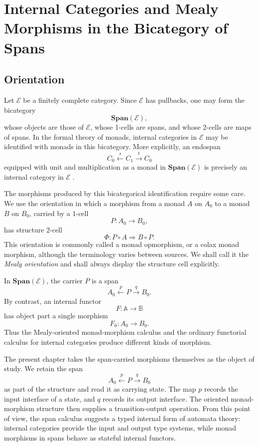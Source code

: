 \chapter{Internal Categories and Mealy Morphisms in the Bicategory of Spans}
\label{ch:spans-internal-categories-mealy}

\section{Orientation}
\label{sec:ch1-orientation}

Let \(\mathcal E\) be a finitely complete category. Since \(\mathcal E\) has pullbacks, one may form the bicategory
\[
    \mathbf{Span}(\mathcal E),
\]
whose objects are those of \(\mathcal E\), whose 1-cells are spans, and whose 2-cells are maps of spans. In the formal theory of monads, internal categories in \(\mathcal E\) may be identified with monads in this bicategory. More explicitly, an endospan
\[
    C_0 \xleftarrow{s} C_1 \xrightarrow{t} C_0
\]
equipped with unit and multiplication as a monad in \(\mathbf{Span}(\mathcal E)\) is precisely an internal category in \(\mathcal E\) \cite{BenabouBicategories,StreetFormalTheoryOfMonads,LackCompanion,MirandaInternalCategories}.

The morphisms produced by this bicategorical identification require some care. We use the orientation in which a morphism from a monad \(A\) on \(A_0\) to a monad \(B\) on \(B_0\), carried by a 1-cell
\[
    P:A_0\to B_0,
\]
has structure 2-cell
\[
    \Phi:P\circ A\Rightarrow B\circ P.
\]
This orientation is commonly called a monad opmorphism, or a colax monad morphism, although the terminology varies between sources. We shall call it the \emph{Mealy orientation} and shall always display the structure cell explicitly.

In \(\mathbf{Span}(\mathcal E)\), the carrier \(P\) is a span
\[
    A_0 \xleftarrow{p} P \xrightarrow{q} B_0.
\]
By contrast, an internal functor
\[
    F:\mathbb A\to\mathbb B
\]
has object part a single morphism
\[
    F_0:A_0\to B_0.
\]
Thus the Mealy-oriented monad-morphism calculus and the ordinary functorial calculus for internal categories produce different kinds of morphism.

The present chapter takes the span-carried morphisms themselves as the object of study. We retain the span
\[
    A_0 \xleftarrow{p} P \xrightarrow{q} B_0
\]
as part of the structure and read it as carrying state. The map \(p\) records the input interface of a state, and \(q\) records its output interface. The oriented monad-morphism structure then supplies a transition-output operation. From this point of view, the span calculus suggests a typed internal form of automata theory: internal categories provide the input and output type systems, while monad morphisms in spans behave as stateful internal functors.

